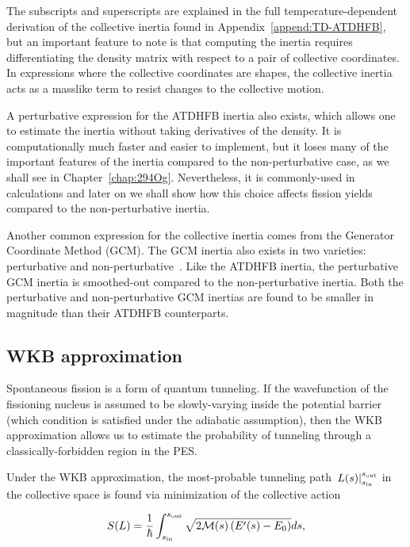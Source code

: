 \noindent The subscripts and superscripts are explained in the full temperature-dependent derivation of the collective inertia found in Appendix~\ref{append:TD-ATDHFB}, but an important feature to note is that computing the inertia requires differentiating the density matrix with respect to a pair of collective coordinates. In expressions where the collective coordinates are shapes, the collective inertia acts as a masslike term to resist changes to the collective motion.

A perturbative expression for the ATDHFB inertia also exists, which allows one to estimate the inertia without taking derivatives of the density. It is computationally much faster and easier to implement, but it loses many of the important features of the inertia compared to the non-perturbative case, as we shall see in Chapter~\ref{chap:294Og}. Nevertheless, it is commonly-used in calculations and later on we shall show how this choice affects fission yields compared to the non-perturbative inertia.

Another common expression for the collective inertia comes from the Generator Coordinate Method (GCM). The GCM inertia also exists in two varieties: perturbative and non-perturbative~\cite{Giuliani2018b}. Like the ATDHFB inertia, the perturbative GCM inertia is smoothed-out compared to the non-perturbative inertia. Both the perturbative and non-perturbative GCM inertias are found to be smaller in magnitude than their ATDHFB counterparts.

\subsection{WKB approximation}\label{sect:wkb}
Spontaneous fission is a form of quantum tunneling. If the wavefunction of the fissioning nucleus is assumed to be slowly-varying inside the potential barrier (which condition is satisfied under the adiabatic assumption), then the WKB approximation allows us to estimate the probability of tunneling through a classically-forbidden region in the PES.

Under the WKB approximation, the most-probable tunneling path $\left. L(s) \right|_{s_{\rm in}}^{s_{\rm out}}$ in the collective space is found via minimization of the collective action

\begin{equation}\label{eq:action} 
S(L) = \frac{1}{\hbar}\int_{s_{\rm in}}^{s_{\rm out}} \sqrt{2\mathcal{M}(s)\left(E'(s)-E_0\right)}ds,
\end{equation} 

